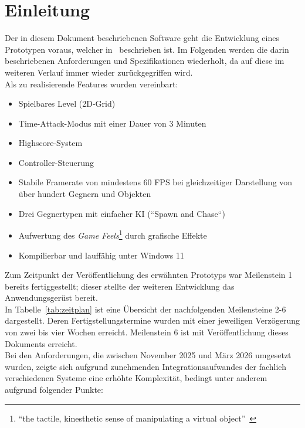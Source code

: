 \chapter{Einleitung}\label{sec:einleitung}

Der in diesem Dokument beschriebenen Software geht die Entwicklung eines Prototypen voraus, welcher in~\cite{SH25} beschrieben ist.
Im Folgenden werden die darin beschriebenen Anforderungen und Spezifikationen wiederholt, da auf diese im weiteren Verlauf immer wieder zurückgegriffen wird.\\

\noindent
Als zu realisierende Features wurden vereinbart:

\begin{itemize}
    \itemsep0.5em
    \item Spielbares Level (2D-Grid)
    \item Time-Attack-Modus mit einer Dauer von 3 Minuten
    \item Highscore-System
    \item Controller-Steuerung
    \item Stabile Framerate von mindestens 60 FPS bei gleichzeitiger Darstellung von über hundert Gegnern und Objekten
    \item Drei Gegnertypen mit einfacher KI (``Spawn and Chase``)
    \item Aufwertung des \textit{Game Feels}\footnote{``the tactile, kinesthetic sense of manipulating a virtual object''~\cite[S. xiii]{Swi08}} durch grafische Effekte
    \item Kompilierbar und lauffähig unter Windows 11
\end{itemize}

\noindent
Zum Zeitpunkt der Veröffentlichung des erwähnten Prototyps war Meilenstein 1 bereits fertiggestellt; dieser stellte der weiteren Entwicklung das Anwendungsgerüst bereit.\\

In Tabelle~\ref{tab:zeitplan} ist eine Übersicht der nachfolgenden Meilensteine 2-6 dargestellt.
Deren Fertigstellungstermine wurden mit einer jeweiligen Verzögerung von zwei bis vier Wochen erreicht.
Meilenstein 6 ist mit Veröffentlichung dieses Dokuments erreicht.\\

Bei den Anforderungen, die zwischen November 2025 und März 2026 umgesetzt wurden, zeigte sich aufgrund zunehmenden Integrationsaufwandes der fachlich verschiedenen Systeme eine erhöhte Komplexität, bedingt unter anderem aufgrund folgender Punkte:

